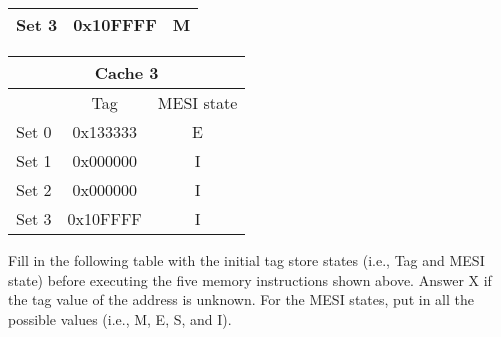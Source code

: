 \begin{center}
\begin{tabular}{|ccc|}
\multicolumn{1}{|c|}{Set 3} & \multicolumn{1}{c|}{0x10FFFF} & M          \\ \hline
\end{tabular}
\begin{tabular}{|ccc|}
\hline
\multicolumn{3}{|c|}{\textbf{Cache 3}}                                   \\ \hline
\multicolumn{1}{|c|}{}      & \multicolumn{1}{c|}{Tag}      & MESI state \\ \hline
\multicolumn{1}{|c|}{Set 0} & \multicolumn{1}{c|}{0x133333} & E          \\ \hline
\multicolumn{1}{|c|}{Set 1} & \multicolumn{1}{c|}{0x000000} & I          \\ \hline
\multicolumn{1}{|c|}{Set 2} & \multicolumn{1}{c|}{0x000000} & I          \\ \hline
\multicolumn{1}{|c|}{Set 3} & \multicolumn{1}{c|}{0x10FFFF} & I          \\ \hline
\end{tabular}
\end{center}
%
Fill in the following table with the initial tag store states (i.e., Tag and MESI state) before executing
the five memory instructions shown above. Answer X if the tag value of the address is unknown. For
the MESI states, put in all the possible values (i.e., M, E, S, and I).
%

